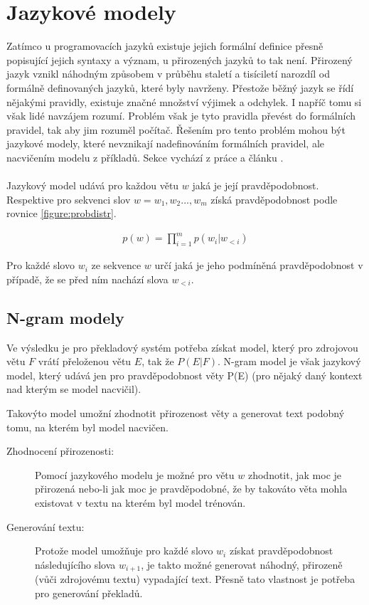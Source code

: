 \section{Jazykové modely}\label{section:langmodel}
Zatímco u programovacích jazyků existuje jejich formální definice přesně popisující jejich syntaxy a význam, u přirozených jazyků to tak není. Přirozený jazyk vznikl náhodným způsobem v průběhu staletí a tisíciletí narozdíl od formálně definovaných jazyků, které byly navrženy. Přestože běžný jazyk se řídí nějakými pravidly, existuje značné množství výjimek a odchylek. I napříč tomu si však lidé navzájem rozumí. Problém však je tyto pravidla převést do formálních pravidel, tak aby jim rozuměl počítač. Řešením pro tento problém mohou být jazykové modely, které nevznikají nadefinováním formálních pravidel, ale nacvičením modelu z příkladů. Sekce vychází z práce \cite{nmtThesis} a článku \cite{nmtTutorial}.
\\\\
Jazykový model udává pro každou větu $w$ jaká je její pravděpodobnost. Respektive pro sekvenci slov $w = w_1, w_2..., w_m$ získá pravděpodobnost podle rovnice \ref{figure:probdistr}.

\begin{align}\label{figure:probdistr}
  p(w) = \prod_{i=1}^{m} p(w_i|w_{<i})
\end{align}

Pro každé slovo $w_i$ ze sekvence $w$ určí jaká je jeho podmíněná pravděpodobnost v případě, že se před ním nachází slova $w_{<i}$.

\subsection{N-gram modely}\label{subsection:ngram}
Ve výsledku je pro překladový systém potřeba získat model, který pro zdrojovou větu $F$ vrátí přeloženou větu $E$, tak že $P(E|F)$. N-gram model je však jazykový model, který udává jen pro pravděpodobnost věty P(E) (pro nějaký daný kontext nad kterým se model nacvičil).

Takovýto model umožní zhodnotit přirozenost věty a generovat text podobný tomu, na kterém byl model nacvičen.

\begin{description}
  \item[Zhodnocení přirozenosti:] Pomocí jazykového modelu je možné pro větu $w$ zhodnotit, jak moc je přirozená nebo-li jak moc je pravděpodobné, že by takováto věta mohla existovat v textu na kterém byl model trénován.
  \item[Generování textu:] Protože model umožňuje pro každé slovo $w_i$ získat pravděpodobnost následujícího slova $w_{i+1}$, je takto možné generovat náhodný, přirozeně (vůči zdrojovému textu) vypadající text. Přesně tato vlastnost je potřeba pro generování překladů.
\end{description}

